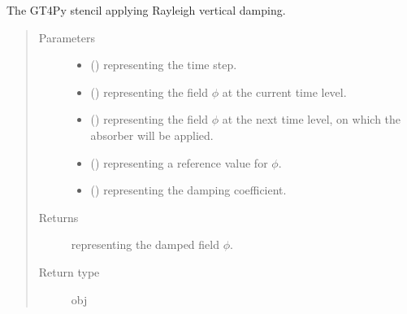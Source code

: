 \documentclass[letterpaper,10pt,english]{sphinxmanual}
\begin{document}
\begin{fulllineitems}
\begin{fulllineitems}
\begin{quote}
\begin{description}
\end{description}\end{quote}

\end{fulllineitems}


\begin{fulllineitems}
\label{\detokenize{api:tasmania.dycore.vertical_damping.VerticalDampingRayleigh._stencil_defs}}
The GT4Py stencil applying Rayleigh vertical damping.
\begin{quote}\begin{description}
\item[{Parameters}] \leavevmode\begin{itemize}
\item {} 
 () \textendash{}  representing the time step.

\item {} 
 () \textendash{}  representing the field \(\phi\) at the current time level.

\item {} 
 () \textendash{}  representing the field \(\phi\) at the next time level, on
which the absorber will be applied.

\item {} 
 () \textendash{}  representing a reference value for \(\phi\).

\item {} 
 () \textendash{}  representing the damping coefficient.

\end{itemize}

\item[{Returns}] \leavevmode
{} representing the damped field \(\phi\).

\item[{Return type}] \leavevmode
obj


\end{description}
\end{quote}
\end{fulllineitems}
\end{fulllineitems}
\end{document}
